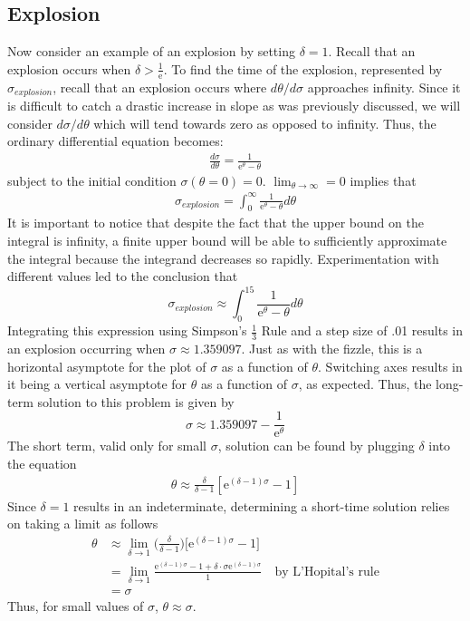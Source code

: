 \documentclass{article}
\begin{document}
\subsection*{Explosion}
Now consider an example of an explosion by setting $\delta = 1$.
Recall that an explosion occurs when $\delta > \frac{1}{\text{e}}$.  To find the time of the explosion, represented by $\sigma_{explosion}$, recall that an explosion occurs where $d\theta/d\sigma$ approaches infinity.  Since it is difficult to catch a drastic increase in slope as was previously discussed, we will consider $d\sigma/d\theta$ which will tend towards zero as opposed to infinity.  Thus, the ordinary differential equation becomes: 
\begin{align*}
    \frac{d\sigma}{d\theta} = \frac{1}{\text{e}^\theta - \theta }
\end{align*}
subject to the initial condition $\sigma(\theta = 0) = 0$.
$\lim_{\theta\to\infty}= 0$ implies that 
\begin{align*}
    \sigma_{explosion} = \int_{0}^{\infty} \frac{1}{\text{e}^\theta - \theta} d\theta
\end{align*}
It is important to notice that despite the fact that the upper bound on the integral is infinity, a finite upper bound will be able to sufficiently approximate the integral because the integrand decreases so rapidly.  Experimentation with different values led to the conclusion that
$$\sigma_{explosion} \approx \int_{0}^{15}\frac{1}{\text{e}^\theta - \theta} d\theta$$
Integrating this expression using Simpson's $\frac{1}{3}$ Rule and a step size of .01 results in an explosion occurring when $\sigma \approx 1.359097$.  Just as with the fizzle, this is a horizontal asymptote for the plot of $\sigma$ as a function of $\theta$.  Switching axes results in it being a vertical asymptote for $\theta$ as a function of $\sigma$, as expected.  Thus, the long-term solution to this problem is given by
$$\sigma\approx 1.359097-\frac{1}{\text{e}^\theta}$$
The short term, valid only for small $\sigma$, solution can be found by plugging $\delta$ into the equation 
\begin{align*}
\theta \approx \frac{\delta}{\delta -1}[\text{e}^{(\delta -1)\sigma} -1]
\end{align*}
Since $\delta = 1$ results in an indeterminate, determining a short-time solution relies on taking a limit as follows
\begin{align*}
    \theta &\approx \lim_{\delta\to1}\Big(\frac{\delta}{\delta - 1}\Big)\Big[\text{e}^{(\delta-1)\sigma}-1\Big]\\
        &= \lim_{\delta\to1}\frac{\text{e}^{(\delta-1)\sigma}-1+ \delta\cdot\sigma \text{e}^{(\delta-1)\sigma}}{1} \quad \text{by L'Hopital's rule}\\
        &= \sigma
\end{align*}
Thus, for small values of $\sigma$, $\theta\approx\sigma$.  
\end{document}
